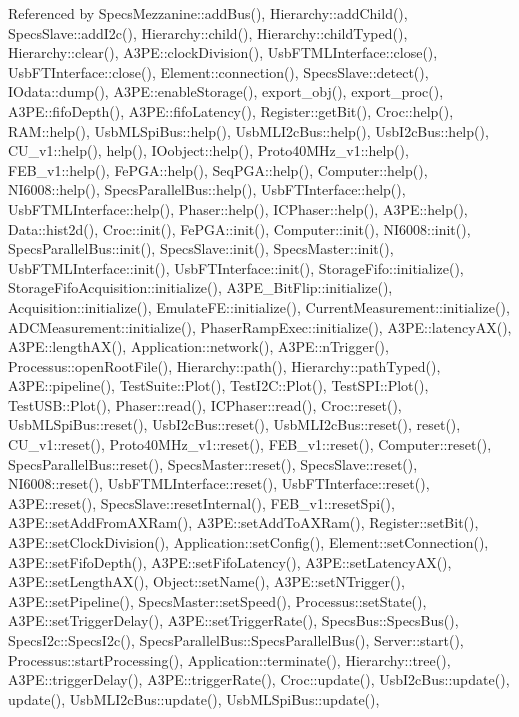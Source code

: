 Referenced by Specs\+Mezzanine\+::add\+Bus(), Hierarchy\+::add\+Child(), Specs\+Slave\+::add\+I2c(), Hierarchy\+::child(), Hierarchy\+::child\+Typed(), Hierarchy\+::clear(), A3\+P\+E\+::clock\+Division(), Usb\+F\+T\+M\+L\+Interface\+::close(), Usb\+F\+T\+Interface\+::close(), Element\+::connection(), Specs\+Slave\+::detect(), I\+Odata\+::dump(), A3\+P\+E\+::enable\+Storage(), export\+\_\+obj(), export\+\_\+proc(), A3\+P\+E\+::fifo\+Depth(), A3\+P\+E\+::fifo\+Latency(), Register\+::get\+Bit(), Croc\+::help(), R\+A\+M\+::help(), Usb\+M\+L\+Spi\+Bus\+::help(), Usb\+M\+L\+I2c\+Bus\+::help(), Usb\+I2c\+Bus\+::help(), C\+U\+\_\+v1\+::help(), help(), I\+Oobject\+::help(), Proto40\+M\+Hz\+\_\+v1\+::help(), F\+E\+B\+\_\+v1\+::help(), Fe\+P\+G\+A\+::help(), Seq\+P\+G\+A\+::help(), Computer\+::help(), N\+I6008\+::help(), Specs\+Parallel\+Bus\+::help(), Usb\+F\+T\+Interface\+::help(), Usb\+F\+T\+M\+L\+Interface\+::help(), Phaser\+::help(), I\+C\+Phaser\+::help(), A3\+P\+E\+::help(), Data\+::hist2d(), Croc\+::init(), Fe\+P\+G\+A\+::init(), Computer\+::init(), N\+I6008\+::init(), Specs\+Parallel\+Bus\+::init(), Specs\+Slave\+::init(), Specs\+Master\+::init(), Usb\+F\+T\+M\+L\+Interface\+::init(), Usb\+F\+T\+Interface\+::init(), Storage\+Fifo\+::initialize(), Storage\+Fifo\+Acquisition\+::initialize(), A3\+P\+E\+\_\+\+Bit\+Flip\+::initialize(), Acquisition\+::initialize(), Emulate\+F\+E\+::initialize(), Current\+Measurement\+::initialize(), A\+D\+C\+Measurement\+::initialize(), Phaser\+Ramp\+Exec\+::initialize(), A3\+P\+E\+::latency\+A\+X(), A3\+P\+E\+::length\+A\+X(), Application\+::network(), A3\+P\+E\+::n\+Trigger(), Processus\+::open\+Root\+File(), Hierarchy\+::path(), Hierarchy\+::path\+Typed(), A3\+P\+E\+::pipeline(), Test\+Suite\+::\+Plot(), Test\+I2\+C\+::\+Plot(), Test\+S\+P\+I\+::\+Plot(), Test\+U\+S\+B\+::\+Plot(), Phaser\+::read(), I\+C\+Phaser\+::read(), Croc\+::reset(), Usb\+M\+L\+Spi\+Bus\+::reset(), Usb\+I2c\+Bus\+::reset(), Usb\+M\+L\+I2c\+Bus\+::reset(), reset(), C\+U\+\_\+v1\+::reset(), Proto40\+M\+Hz\+\_\+v1\+::reset(), F\+E\+B\+\_\+v1\+::reset(), Computer\+::reset(), Specs\+Parallel\+Bus\+::reset(), Specs\+Master\+::reset(), Specs\+Slave\+::reset(), N\+I6008\+::reset(), Usb\+F\+T\+M\+L\+Interface\+::reset(), Usb\+F\+T\+Interface\+::reset(), A3\+P\+E\+::reset(), Specs\+Slave\+::reset\+Internal(), F\+E\+B\+\_\+v1\+::reset\+Spi(), A3\+P\+E\+::set\+Add\+From\+A\+X\+Ram(), A3\+P\+E\+::set\+Add\+To\+A\+X\+Ram(), Register\+::set\+Bit(), A3\+P\+E\+::set\+Clock\+Division(), Application\+::set\+Config(), Element\+::set\+Connection(), A3\+P\+E\+::set\+Fifo\+Depth(), A3\+P\+E\+::set\+Fifo\+Latency(), A3\+P\+E\+::set\+Latency\+A\+X(), A3\+P\+E\+::set\+Length\+A\+X(), Object\+::set\+Name(), A3\+P\+E\+::set\+N\+Trigger(), A3\+P\+E\+::set\+Pipeline(), Specs\+Master\+::set\+Speed(), Processus\+::set\+State(), A3\+P\+E\+::set\+Trigger\+Delay(), A3\+P\+E\+::set\+Trigger\+Rate(), Specs\+Bus\+::\+Specs\+Bus(), Specs\+I2c\+::\+Specs\+I2c(), Specs\+Parallel\+Bus\+::\+Specs\+Parallel\+Bus(), Server\+::start(), Processus\+::start\+Processing(), Application\+::terminate(), Hierarchy\+::tree(), A3\+P\+E\+::trigger\+Delay(), A3\+P\+E\+::trigger\+Rate(), Croc\+::update(), Usb\+I2c\+Bus\+::update(), update(), Usb\+M\+L\+I2c\+Bus\+::update(), Usb\+M\+L\+Spi\+Bus\+::update(), 